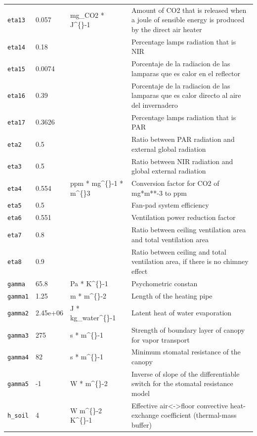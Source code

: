 \documentclass[11pt,a4paper]{article}
\begin{document}
\begin{longtable}{@{}p{} p{} p{} p{}@{}}
\texttt{eta13} & 0.057 & mg\_CO2 * J\textasciicircum\{\}-1 & Amount of CO2 that is released when a joule of sensible energy is produced by the direct air heater\\
\texttt{eta14} & 0.18 &  & Percentage lamps radiation that is NIR\\
\texttt{eta15} & 0.0074 &  & Porcentaje de la radiacion de las lamparas que es calor en el reflector\\
\texttt{eta16} & 0.39 &  & Porcentaje de la radiacion de las lamparas que es calor directo al aire del invernadero\\
\texttt{eta17} & 0.3626 &  & Percentage lamps radiation that is PAR\\
\texttt{eta2} & 0.5 &  & Ratio between PAR radiation and external global radiation\\
\texttt{eta3} & 0.5 &  & Ratio between NIR radiation and global external radiation\\
\texttt{eta4} & 0.554 & ppm * mg\textasciicircum\{\}-1 * m\textasciicircum\{\}3 & Conversion factor for CO2 of mg*m**-3 to ppm\\
\texttt{eta5} & 0.5 &  & Fan-pad system efficiency\\
\texttt{eta6} & 0.551 &  & Ventilation power reduction factor\\
\texttt{eta7} & 0.8 &  & Ratio between ceiling ventilation area and total ventilation area\\
\texttt{eta8} & 0.9 &  & Ratio between ceiling and total ventilation area, if there is no chimney effect\\
\texttt{gamma} & 65.8 & Pa * K\textasciicircum\{\}-1 & Psychometric constan\\
\texttt{gamma1} & 1.25 & m * m\textasciicircum\{\}-2 & Length of the heating pipe\\
\texttt{gamma2} & 2.45e+06 & J * kg\_water\textasciicircum\{\}-1 & Latent heat of water evaporation\\
\texttt{gamma3} & 275 & s * m\textasciicircum\{\}-1 & Strength of boundary layer of canopy for vapor transport\\
\texttt{gamma4} & 82 & s * m\textasciicircum\{\}-1 & Minimum stomatal resistance of the canopy\\
\texttt{gamma5} & -1 & W * m\textasciicircum\{\}-2 & Inverse of slope of the differentiable switch for the stomatal resistance model\\
\texttt{h\_soil} & 4 & W m\textasciicircum\{\}-2 K\textasciicircum\{\}-1 & Effective air<->floor convective heat-exchange coefficient (thermal-mass buffer)\\

\end{longtable}
\end{document}
